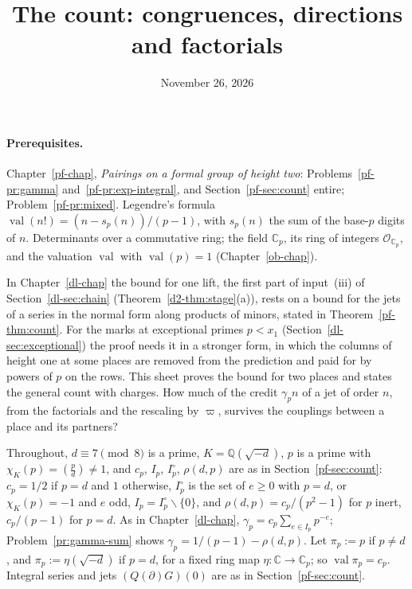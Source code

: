 \documentclass[reqno]{amsart}
\title{The count: congruences, directions and factorials}
\author{}
\date{November 26, 2026}
\newcounter{chap}
\theoremstyle{plain}
\theoremstyle{definition}
\theoremstyle{remark}
\newcommand{\Q}{\mathbb{Q}}
\newcommand{\C}{\mathbb{C}}
\newcommand{\Op}{\mathcal{O}_{\C_p}}
\newcommand{\val}{\operatorname{val}}
\begin{document}
\maketitle
{}\label{chap}

\paragraph{Prerequisites.}
Chapter~\ref{pf-chap}, \emph{Pairings on a formal group of height two}: Problems~\ref{pf-pr:gamma} and~\ref{pf-pr:exp-integral}, and Section~\ref{pf-sec:count} entire; Problem~\ref{pf-pr:mixed}.  Legendre's formula \(\val(n!) = (n - s_p(n))/(p-1)\), with \(s_p(n)\) the sum of the base-\(p\) digits of \(n\).  Determinants over a commutative ring; the field \(\C_p\), its ring of integers \(\Op\), and the valuation \(\val\) with \(\val(p) = 1\) (Chapter~\ref{ob-chap}).

\medskip
In Chapter~\ref{dl-chap} the bound for one lift, the first part of input~(iii) of Section~\ref{dl-sec:chain} (Theorem~\ref{d2-thm:stage}(a)), rests on a bound for the jets of a series in the normal form along products of minors, stated in Theorem~\ref{pf-thm:count}.  For the marks at exceptional primes \(p < x_1\) (Section~\ref{dl-sec:exceptional}) the proof \cite{GL} needs it in a stronger form, in which the columns of height one at some places are removed from the prediction and paid for by powers of \(p\) on the rows.  This sheet proves the bound for two places and states the general count with charges.  How much of the credit \(\gamma_p n\) of a jet of order \(n\), from the factorials and the rescaling by \(\varpi\), survives the couplings between a place and its partners?

Throughout, \(d \equiv 7 \pmod 8\) is a prime, \(K = \Q(\sqrt{-d})\), \(p\) is a prime with \(\chi_K(p) = (\frac{p}{d}) \ne 1\), and \(c_p\), \(I_p\), \(I_p^\circ\), \(\rho(d,p)\) are as in Section~\ref{pf-sec:count}: \(c_p = 1/2\) if \(p = d\) and \(1\) otherwise, \(I_p^\circ\) is the set of \(e \ge 0\) with \(p = d\), or \(\chi_K(p) = -1\) and \(e\) odd, \(I_p = I_p^\circ \smallsetminus \{0\}\), and \(\rho(d,p) = c_p/(p^2 - 1)\) for \(p\) inert, \(c_p/(p-1)\) for \(p = d\).  As in Chapter~\ref{dl-chap}, \(\gamma_p = c_p\sum_{e \in I_p} p^{-e}\); Problem~\ref{pr:gamma-sum} shows \(\gamma_p = 1/(p-1) - \rho(d,p)\).  Let \(\pi_p := p\) if \(p \ne d\), and \(\pi_p := \eta(\sqrt{-d})\) if \(p = d\), for a fixed ring map \(\eta\colon \C \to \C_p\); so \(\val \pi_p = c_p\).  Integral series and jets \((Q(\partial)G)(0)\) are as in Section~\ref{pf-sec:count}.
\end{document}
